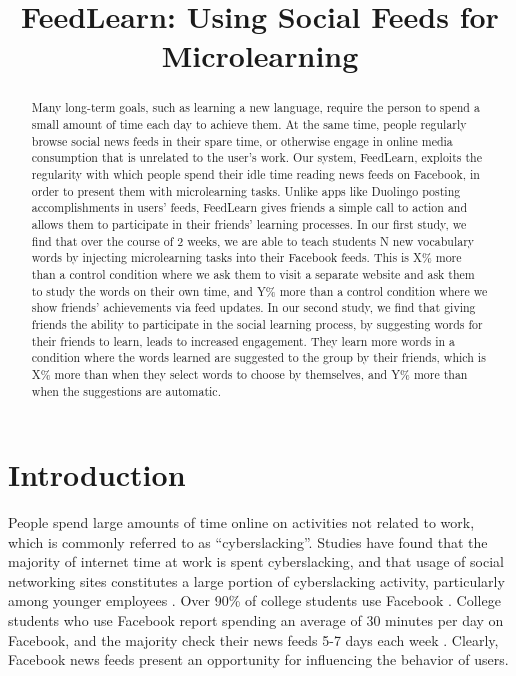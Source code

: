 \documentclass{chi-ext}
\title{FeedLearn: Using Social Feeds for Microlearning}
\author{
  \alignauthor{
  	\textbf{Geza Kovacs}\\
  	\affaddr{Department of Computer Science, Stanford University}\\
  	\email{geza@cs.stanford.edu}
  }
}
\def\plainkeywords{microlearning, social feeds, language learning}
\begin{document}
\maketitle

\begin{abstract}
Many long-term goals, such as learning a new language,
require the person to spend a small amount of time each day to achieve them.
At the same time, people regularly browse social news feeds in their spare time, or otherwise
engage in online media consumption that is unrelated to the user's work.
Our system, FeedLearn, exploits the regularity with which people spend their idle time reading news feeds on Facebook,
in order to present them with microlearning tasks. Unlike apps like Duolingo posting accomplishments in users' feeds, FeedLearn gives friends a simple call to action and allows them to participate in their friends' learning processes.
In our first study, we find that over the course of 2 weeks, we are able to teach students N new vocabulary words by injecting microlearning tasks into their Facebook feeds. This is X\% more than a control condition where we ask them to visit a separate website and ask them to study the words on their own time, and Y\% more than a control condition where we show friends' achievements via feed updates. In our second study, we find that giving friends the ability to participate in the social learning process, by suggesting words for their friends to learn, leads to increased engagement. They learn more words in a condition where the words learned are suggested to the group by their friends, which is X\% more than when they select words to choose by themselves, and Y\% more than when the suggestions are automatic.
\end{abstract}

\keywords{\plainkeywords}



\section{Introduction}

People spend large amounts of time online on activities not related to work,
which is commonly referred to as ``cyberslacking''.
Studies have found that the majority of internet time at work is spent cyberslacking,
and that usage of social networking sites
constitutes a large portion of cyberslacking activity, particularly among younger employees \cite{cyberslacking}. Over 90\% of college students use Facebook \cite{collegefacebook2}. College students who use Facebook report spending an average of 30 minutes per day on Facebook, and the majority check their news feeds 5-7 days each week \cite{collegefacebook}. Clearly, Facebook news feeds present an opportunity for influencing the behavior of users.
\end{document}
